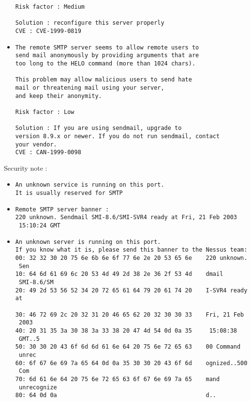 \documentclass{article}
\begin{document}
\begin{itemize}
\begin{verbatim}
Risk factor : Medium

Solution : reconfigure this server properly
CVE : CVE-1999-0819
\end{verbatim}\item \begin{verbatim}
The remote SMTP server seems to allow remote users to
send mail anonymously by providing arguments that are 
too long to the HELO command (more than 1024 chars).

This problem may allow malicious users to send hate
mail or threatening mail using your server,
and keep their anonymity.

Risk factor : Low

Solution : If you are using sendmail, upgrade to
version 8.9.x or newer. If you do not run sendmail, contact
your vendor.
CVE : CAN-1999-0098
\end{verbatim}\end{itemize}
Security note :\\
\begin{itemize}
\item \begin{verbatim}
An unknown service is running on this port.
It is usually reserved for SMTP
\end{verbatim}\item \begin{verbatim}
Remote SMTP server banner :
220 unknown. Sendmail SMI-8.6/SMI-SVR4 ready at Fri, 21 Feb 2003
 15:10:24 GMT

\end{verbatim}\item \begin{verbatim}
An unknown server is running on this port.
If you know what it is, please send this banner to the Nessus team:
00: 32 32 30 20 75 6e 6b 6e 6f 77 6e 2e 20 53 65 6e    220 unknown.
 Sen
10: 64 6d 61 69 6c 20 53 4d 49 2d 38 2e 36 2f 53 4d    dmail
 SMI-8.6/SM
20: 49 2d 53 56 52 34 20 72 65 61 64 79 20 61 74 20    I-SVR4 ready at
 
30: 46 72 69 2c 20 32 31 20 46 65 62 20 32 30 30 33    Fri, 21 Feb
 2003
40: 20 31 35 3a 30 38 3a 33 38 20 47 4d 54 0d 0a 35     15:08:38
 GMT..5
50: 30 30 20 43 6f 6d 6d 61 6e 64 20 75 6e 72 65 63    00 Command
 unrec
60: 6f 67 6e 69 7a 65 64 0d 0a 35 30 30 20 43 6f 6d    ognized..500
 Com
70: 6d 61 6e 64 20 75 6e 72 65 63 6f 67 6e 69 7a 65    mand
 unrecognize
80: 64 0d 0a                                           d..            
                           



\end{verbatim}\end{itemize}
\end{document}
